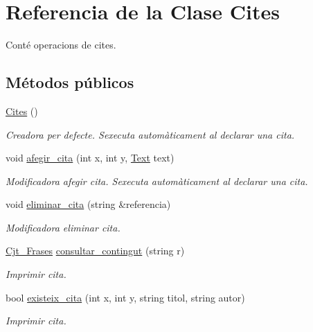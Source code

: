 \hypertarget{class_cites}{}\section{Referencia de la Clase Cites}
\label{class_cites}


Conté operacions de cites.  


\subsection*{Métodos públicos}
\begin{DoxyCompactItemize}
\item 
\hyperlink{class_cites_aef7c40360c5537b4dac136a758e815fc}{Cites} ()
\begin{DoxyCompactList}\small\item\em Creadora per defecte. S\textquotesingle{}executa automàticament al declarar una cita. \end{DoxyCompactList}\item 
void \hyperlink{class_cites_ac39a9d48653f5cbd3e6b49dd9174035f}{afegir\+\_\+cita} (int x, int y, \hyperlink{class_text}{Text} text)
\begin{DoxyCompactList}\small\item\em Modificadora afegir cita. S\textquotesingle{}executa automàticament al declarar una cita. \end{DoxyCompactList}\item 
void \hyperlink{class_cites_a4abd76ae9a2cf1883a4ca233b7f6879e}{eliminar\+\_\+cita} (string \&referencia)
\begin{DoxyCompactList}\small\item\em Modificadora eliminar cita. \end{DoxyCompactList}\item 
\hyperlink{class_cjt___frases}{Cjt\+\_\+\+Frases} \hyperlink{class_cites_aaed19239876da7b34636457a0641c7e4}{consultar\+\_\+contingut} (string r)
\begin{DoxyCompactList}\small\item\em Imprimir cita. \end{DoxyCompactList}\item 
bool \hyperlink{class_cites_a4a084e0d91b69314dc14fc4b5974595f}{existeix\+\_\+cita} (int x, int y, string titol, string autor)
\begin{DoxyCompactList}\small\item\em Imprimir cita. \end{DoxyCompactList}\item 

\end{DoxyCompactItemize}
